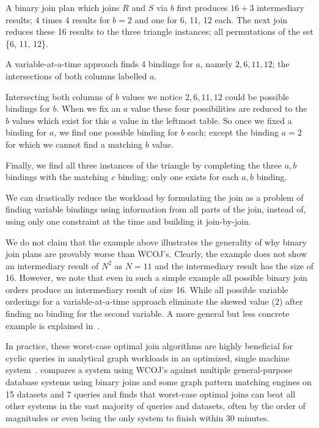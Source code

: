 A binary join plan which joins $R$ and $S$ via $b$ first produces $16 + 3$ intermediary results;
4 times 4 results for $b = 2$ and one for 6, 11, 12 each.
The next join reduces these 16 results to the three triangle instances; all permutations of the set \{6, 11, 12\}.

A variable-at-a-time approach finds 4 bindings for $a$, namely  $2, 6, 11, 12$;
the intersections of both columns labelled $a$.

Intersecting both columns of $b$ values we notice $2, 6, 11, 12$ could be possible bindings for $b$.
When we fix an $a$ value these four possibilities are reduced to the $b$ values which exist for this
$a$ value in the leftmost table.
So once we fixed a binding for $a$, we find one possible binding for $b$ each;
except the binding $a = 2$ for which we cannot find a matching $b$ value.

Finally, we find all three instances of the triangle by completing the three $a, b$ bindings with
the matching $c$ binding;
only one exists for each $a, b$ binding.

We can drastically reduce the workload by formulating the join as a problem of
finding variable bindings using information from all parts of the join, instead of, using only one constraint at the time
and building it join-by-join.

We do not claim that the example above illustrates the generality of why binary join plans are provably worse than
\textsc{WCOJ}'s.
Clearly, the example does not show an intermediary result of $N^2$ as $N = 11$ and the intermediary result has the size of 16.
However, we note that even in such a simple example all possible binary join orders produce an intermediary result of size 16.
While all possible variable orderings for a variable-at-a-time approach eliminate the skewed value (2) after finding no binding
for the second variable.
A more general but less concrete example is explained in~\cite{skew-strikes-back}.

In practice, these worst-case optimal join algorithms are highly beneficial for cyclic queries in analytical graph
workloads in an optimized, single machine system~\cite{leapfrog,olddog}.
\cite{olddog} compares a system using \textsc{WCOJ}'s against multiple general-purpose database
systems using binary joins and some graph pattern matching engines on 15 datasets and 7 queries and
finds that worst-case optimal joins can beat all other systems in the vast majority of queries
and datasets, often by the order of magnitudes or even being the only system to finish within 30 minutes.

